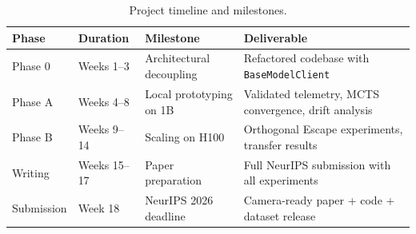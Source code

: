 \documentclass{article}
\begin{document}
\begin{table}[h]
\centering
\begin{tabular}{@{}llll@{}}
\toprule
\textbf{Phase} & \textbf{Duration} & \textbf{Milestone} & \textbf{Deliverable} \\
\midrule
Phase 0 & Weeks 1--3 & Architectural decoupling & Refactored codebase with \texttt{BaseModelClient} \\
Phase A & Weeks 4--8 & Local prototyping on 1B & Validated telemetry, MCTS convergence, drift analysis \\
Phase B & Weeks 9--14 & Scaling on H100 & Orthogonal Escape experiments, transfer results \\
Writing & Weeks 15--17 & Paper preparation & Full NeurIPS submission with all experiments \\
Submission & Week 18 & NeurIPS 2026 deadline & Camera-ready paper + code + dataset release \\
\bottomrule
\end{tabular}
\caption{Project timeline and milestones.}
\label{tab:timeline}
\end{table}
\end{document}
